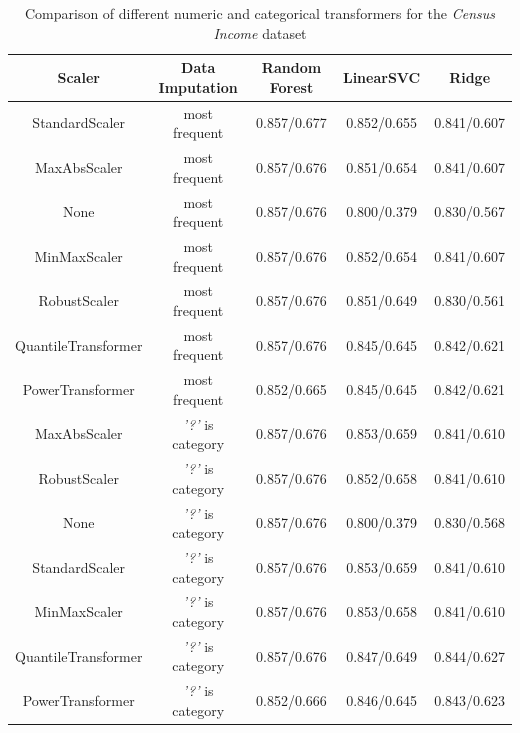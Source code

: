 \documentclass[a4paper,10pt]{article}
\begin{document}
\begin{table}[h!]
\centering
\small
\begin{tabular}{|c|c|c|c|c|}
\hline
\textbf{Scaler} & \textsf{Data Imputation} & \textbf{Random Forest} & \textbf{LinearSVC} & \textbf{Ridge} \\
\hline
StandardScaler & most frequent & \cellcolor[HTML]{C1E1C1}0.857/0.677 & 0.852/0.655 & 0.841/0.607 \\
\hline
MaxAbsScaler & most frequent & 0.857/0.676 & 0.851/0.654 & 0.841/0.607 \\
\hline
None & most frequent & 0.857/0.676 & 0.800/0.379 & 0.830/0.567 \\
\hline
MinMaxScaler & most frequent & 0.857/0.676 & 0.852/0.654 & 0.841/0.607 \\
\hline
RobustScaler & most frequent & 0.857/0.676 & 0.851/0.649 & 0.830/0.561 \\
\hline
QuantileTransformer & most frequent & 0.857/0.676 & 0.845/0.645 & 0.842/0.621 \\
\hline
PowerTransformer & most frequent & 0.852/0.665 & 0.845/0.645 & 0.842/0.621 \\
\hline
MaxAbsScaler & \textit{'?'} is category & 0.857/0.676 & 0.853/0.659 & 0.841/0.610 \\
\hline
RobustScaler & \textit{'?'} is category & 0.857/0.676 & 0.852/0.658 & 0.841/0.610 \\
\hline
None & \textit{'?'} is category & 0.857/0.676 & 0.800/0.379 & 0.830/0.568 \\
\hline
StandardScaler & \textit{'?'} is category & 0.857/0.676 & \cellcolor[HTML]{C1E1C1}0.853/0.659 & 0.841/0.610 \\
\hline
MinMaxScaler & \textit{'?'} is category & 0.857/0.676 & 0.853/0.658 & 0.841/0.610 \\
\hline
QuantileTransformer & \textit{'?'} is category & 0.857/0.676 & 0.847/0.649 & \cellcolor[HTML]{C1E1C1}0.844/0.627 \\
\hline
PowerTransformer & \textit{'?'} is category & 0.852/0.666 & 0.846/0.645 & 0.843/0.623 \\
\hline
\end{tabular}
\caption{Comparison of different numeric and categorical transformers for the \textit{Census Income} dataset}
\label{table:censustransformers}
\end{table}
\end{document}

